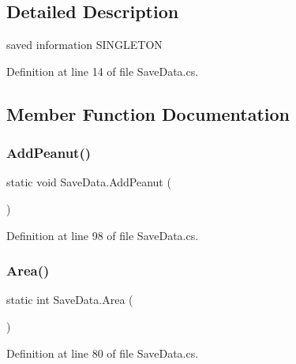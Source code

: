 \subsection{Detailed Description}
saved information S\+I\+N\+G\+L\+E\+T\+ON 



Definition at line 14 of file Save\+Data.\+cs.



\subsection{Member Function Documentation}
\mbox{\label{class_save_data_a6094e9e834bdc6589bc86e863f1bce9b}} 
\subsubsection{\texorpdfstring{Add\+Peanut()}{AddPeanut()}}
{\footnotesize\ttfamily static void Save\+Data.\+Add\+Peanut (\begin{DoxyParamCaption}{ }\end{DoxyParamCaption})\hspace{0.3cm}{\ttfamily [static]}}



Definition at line 98 of file Save\+Data.\+cs.

\mbox{\label{class_save_data_a22fab0214f794c9bc004557484e51fc0}} 
\subsubsection{\texorpdfstring{Area()}{Area()}}
{\footnotesize\ttfamily static int Save\+Data.\+Area (\begin{DoxyParamCaption}{ }\end{DoxyParamCaption})\hspace{0.3cm}{\ttfamily [static]}}



Definition at line 80 of file Save\+Data.\+cs.

\mbox{\label{class_save_data_a797f7cb34d1d4643d7606abd09abb352}} 
